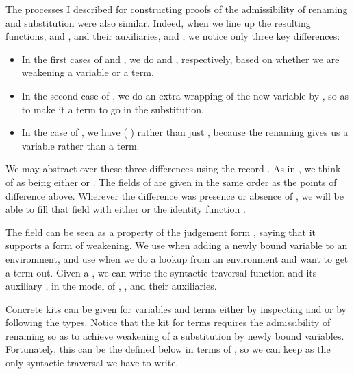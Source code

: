 \Env{}
\RenSub{}

The processes I described for constructing proofs of the admissibility of
renaming and substitution were also similar.
Indeed, when we line up the resulting functions,  and
, and their auxiliaries,  and
, we notice only three key
differences:~\cite{McBride05,BHKM12}

\begin{itemize}
  \item In the first cases of  and ,
    we do  and , respectively, based on
    whether we are weakening a variable or a term.
  \item In the second case of , we do an extra wrapping of
    the new variable by , so as to make it a term
    to go in the substitution.
  \item In the  case of , we
    have  \AgdaSymbol(\AgdaBound{$\rho$}
    \AgdaSymbol) rather than just \AgdaBound{$\rho$} ,
    because the renaming \AgdaBound{$\rho$} gives us a variable rather than a
    term.
\end{itemize}

We may abstract over these three differences using the record .
As in , we think of  as being either
\AgdaDatatype{\_$\ni$\_} or \AgdaDatatype{\_$\vdash$\_}.
The fields of  are given in the same order as the points of
difference above.
Wherever the difference was presence or absence of
, we will be able to fill that field with either
 or the identity function .

\Kit{}

The field  can be seen as a property of the
judgement form , saying that it supports a form of weakening.
We use  when adding a newly bound variable to an environment, and
use  when we do a lookup from an environment and want to get a
term out.
Given a  , we can write the syntactic traversal
function  and its auxiliary , in the
model of , , and their auxiliaries.

\trav{}
\bindEnv{}

Concrete kits can be given for variables and terms either by inspecting
 and  or by following the types.
Notice that the kit for terms requires the admissibility of renaming so as to
achieve weakening of a substitution by newly bound variables.
Fortunately, this can be the  defined below in terms of
, so we can keep  as the only syntactic
traversal we have to write.

\begin{multicols}{2}
  \noindent\renKit{} \columnbreak

  \noindent\subKit{}
\end{multicols}
